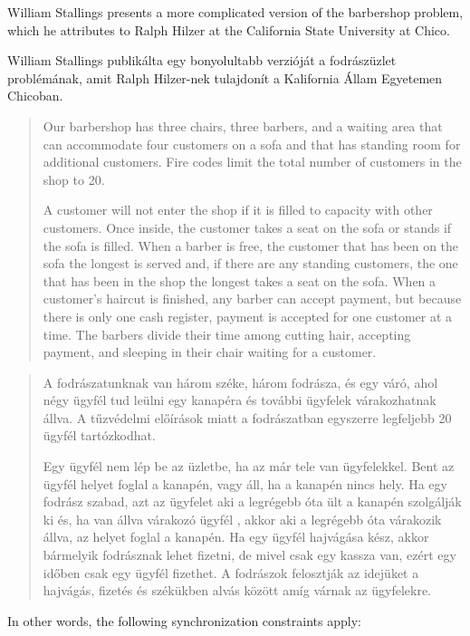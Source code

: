 \documentclass{book}
\begin{document}
William Stallings \cite{stallings} presents a more complicated version
of the barbershop problem, which he attributes to Ralph Hilzer at the
California State University at Chico.

William Stallings \cite{stallings} publikálta egy bonyolultabb verzióját a fodrászüzlet problémának,
amit Ralph Hilzer-nek tulajdonít a Kalifornia Állam Egyetemen Chicoban.

\begin{quotation}
Our barbershop has three chairs, three barbers, and a waiting
area that can accommodate four customers on a sofa and that has
standing room for additional customers.  Fire codes limit the
total number of customers in the shop to 20.

A customer will not enter the shop if it is filled to capacity with
other customers.  Once inside, the customer takes a seat on the sofa
or stands if the sofa is filled.  When a barber is free, the customer
that has been on the sofa the longest is served and, if there are any
standing customers, the one that has been in the shop the longest
takes a seat on the sofa.  When a customer's haircut is finished, any
barber can accept payment, but because there is only one cash
register, payment is accepted for one customer at a time.  The barbers
divide their time among cutting hair, accepting payment, and sleeping
in their chair waiting for a customer.
\end{quotation}

\begin{quotation}
A fodrászatunknak van három széke, három fodrásza, és egy váró, ahol
négy ügyfél tud leülni egy kanapéra és további ügyfelek várakozhatnak állva.
A tűzvédelmi előírások miatt a fodrászatban egyszerre legfeljebb 20 ügyfél tartózkodhat.

Egy ügyfél nem lép be az üzletbe, ha az már tele van ügyfelekkel.
Bent az ügyfél helyet foglal a kanapén, vagy áll, ha a kanapén nincs hely.
Ha egy fodrász szabad, azt az ügyfelet aki a legrégebb óta ült a kanapén
szolgálják ki és, ha van állva várakozó ügyfél , akkor aki a legrégebb óta
várakozik állva, az helyet foglal a kanapén. Ha egy ügyfél hajvágása kész,
akkor bármelyik fodrásznak lehet fizetni, de mivel csak egy kassza van,
ezért egy időben csak egy ügyfél fizethet. A fodrászok felosztják az
idejüket a hajvágás,  fizetés és székükben alvás között
amíg várnak az ügyfelekre.
\end{quotation}


In other words, the following synchronization constraints apply:
\end{document}
